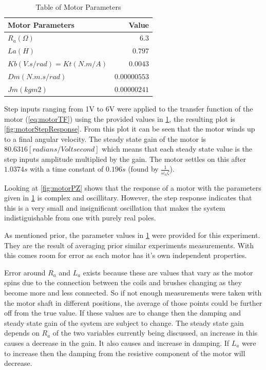 \documentclass[a4paper, 11pt, compsoc]{IEEEtran}
\begin{document}
            \begin{table}
                \centering
                \caption{Table of Motor Parameters}
                \label{tab:motorValues}
                \begin{tabular}{l|r}
                    Motor Parameters  & Value\\
                    \hline
                    $R_a (\Omega)$ & $6.3$\\
                    $La (H)$ & $0.797$ \\
                    $Kb (V.s/rad) = Kt (N.m/A)$ & $0.0043$ \\
                    $Dm (N.m.s/rad)$ & $0.00000553$ \\
                    $Jm (kgm2)$ & $0.00000241$
                \end{tabular}
            \end{table}
            Step inputs ranging from 1V to 6V were applied to the transfer function of the motor (\cref{eq:motorTF}) using the provided values in \cref{tab:motorValues}, the resulting plot is \cref{fig:motorStepResponse}. From this plot it can be seen that the motor winds up to a final angular velocity. The steady state gain of the motor is $80.6316 [radians/Volt second]$ which means that each steady state value is the step inputs amplitude multiplied by the gain. The motor settles on this after $1.0374 s$ with a time constant of $0.196 s$ (found by $\frac{1}{\omega_n \zeta}$).
            \par
            Looking at \cref{fig:motorPZ} shows that the response of a motor with the parameters given in \cref{tab:motorValues} is complex and oscillitary. However, the step response indicates that this is a very small and insignificant oscillation that makes the system indistiguishable from one with purely real poles.
            \par
            As mentioned prior, the parameter values in \cref{tab:motorValues} were provided for this experiment. They are the result of averaging prior similar experiments measurements. With this comes room for error as each motor has it's own independent properties.
            \par
            Error around $R_a$ and $L_a$ exists because these are values that vary as the motor spins due to the connection between the coils and brushes changing as they become more and less connected. So if not enough measurements were taken with the motor shaft in different positions, the average of those points could be further off from the true value. If these values are to change then the damping and steady state gain of the system are subject to change. The steady state gain depends on $R_a$ of the two variables currently being discussed, an increase in this causes a decrease in the gain. It also causes and increase in damping. If $L_a$ were to increase then the damping from the resistive component of the motor will decrease.
\end{document}
